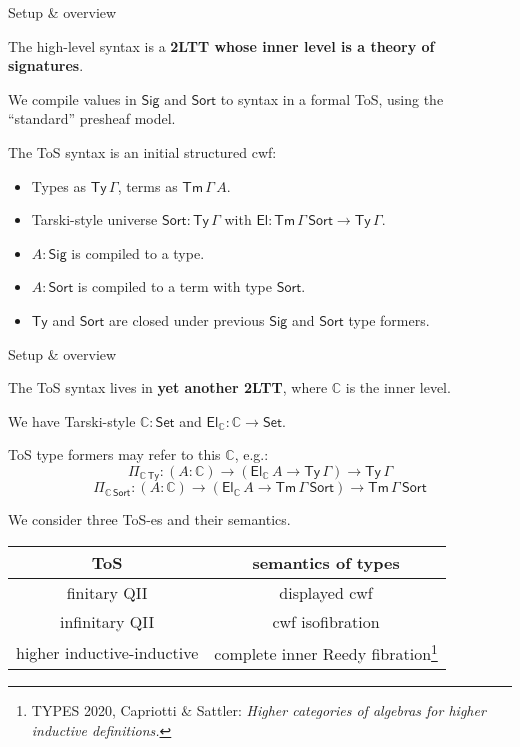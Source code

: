 \documentclass[dvipsnames]{beamer}
\newcommand{\mbb}[1]{\mathbb{#1}}
\newcommand{\Tm}{\mathsf{Tm}}
\newcommand{\Ty}{\mathsf{Ty}}
\newcommand{\El}{\mathsf{El}}
\newcommand{\Set}{\mathsf{Set}}
\newcommand{\Sort}{\mathsf{Sort}}
\newcommand{\Sig}{\mathsf{Sig}}
\newcommand{\mbbC}{\mbb{C}}
\begin{document}
\begin{frame}{Setup \& overview}

The high-level syntax is a \textbf{2LTT whose inner level is a theory of signatures}.
\vspace{1em}

We compile values in $\Sig$ and $\Sort$ to syntax in a formal ToS,
using the ``standard'' presheaf model.
\vspace{1em}

The ToS syntax is an initial structured cwf:
\begin{itemize}
  \item Types as $\Ty\,\Gamma$, terms as $\Tm\,\Gamma\,A$.
  \item Tarski-style universe $\Sort : \Ty\,\Gamma$ with
        $\El : \Tm\,\Gamma\,\Sort \to \Ty\,\Gamma$.
  \item $A : \Sig$ is compiled to a type.
  \item $A : \Sort$ is compiled to a term with type $\Sort$.
  \item $\Ty$ and $\Sort$ are closed under previous $\Sig$ and $\Sort$
        type formers.
\end{itemize}

\end{frame}

\begin{frame}{Setup \& overview}

The ToS syntax lives in \textbf{yet another 2LTT}, where $\mbbC$ is
the inner level.
\vspace{1em}

We have Tarski-style $\mbbC : \Set$ and $\El_\mbbC : \mbbC \to \Set$.
\vspace{1em}

ToS type formers may refer to this $\mbbC$, e.g.:
\[ \Pi_{\mbbC\,\Ty} : (A : \mbbC) \to (\El_\mbbC\,A \to \Ty\,\Gamma) \to \Ty\,\Gamma \]
\[ \Pi_{\mbbC\,\Sort} : (A : \mbbC) \to (\El_\mbbC\,A \to \Tm\,\Gamma\,\Sort) \to \Tm\,\Gamma\,\Sort \]

We consider three ToS-es and their semantics.
\begin{center}
\begin{tabular}{|c|c|}
\hline
  \textbf{ToS} & \textbf{semantics of types} \\
\hline
  finitary QII & displayed cwf \\
\hline
  infinitary QII & cwf isofibration \\
\hline
  higher inductive-inductive & complete inner Reedy fibration\footnote{TYPES 2020, Capriotti \& Sattler: \emph{Higher categories of algebras for higher inductive definitions.}} \\
\hline
\end{tabular}
\end{center}




\end{frame}
\end{document}
